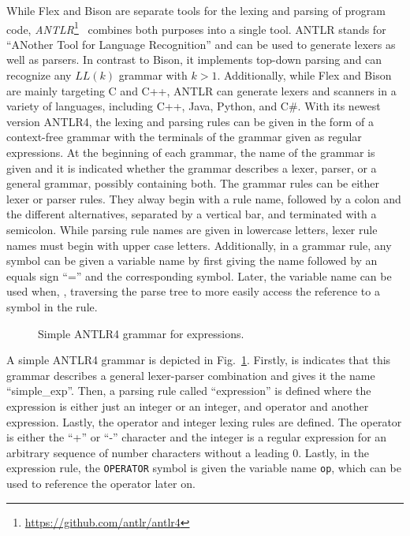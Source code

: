 While Flex and Bison are separate tools for the lexing and parsing of program code, \emph{ANTLR}\footnote{\url{https://github.com/antlr/antlr4}}~\cite{PaQu95} combines both purposes into a single tool. ANTLR stands for ``ANother Tool for Language Recognition'' and can be used to generate lexers as well as parsers. In contrast to Bison, it implements top-down parsing and can recognize any $LL(k)$ grammar with $k > 1$. Additionally, while Flex and Bison are mainly targeting C and C++, ANTLR can generate lexers and scanners in a variety of languages, including C++, Java, Python, and C\#.
With its newest version ANTLR4, the lexing and parsing rules can be given in the form of a context-free grammar with the terminals of the grammar given as regular expressions. At the beginning of each grammar, the name of the grammar is given and it is indicated whether the grammar describes a lexer, parser, or a general grammar, possibly containing both. The grammar rules can be either lexer or parser rules. They alway begin with a rule name, followed by a colon and the different alternatives, separated by a vertical bar, and terminated with a semicolon. While parsing rule names are given in lowercase letters, lexer rule names must begin with upper case letters.
Additionally, in a grammar rule, any symbol can be given a variable name by first giving the name followed by an equals sign ``='' and the corresponding symbol. Later, the variable name can be used when, \eg, traversing the parse tree to more easily access the reference to a symbol in the rule.

\begin{figure}[htp]
    \centering
    
    \caption{Simple ANTLR4 grammar for expressions.}
    \label{fig:example_antlr4}
\end{figure}

A simple ANTLR4 grammar is depicted in Fig.~\ref{fig:example_antlr4}. Firstly, is indicates that this grammar describes a general lexer-parser combination and gives it the name \mbox{``simple\_exp''}. Then, a parsing rule called ``expression'' is defined where the expression is either just an integer or an integer, and operator and another expression. Lastly, the operator and integer lexing rules are defined. The operator is either the ``+'' or ``-'' character and the integer is a regular expression for an arbitrary sequence of number characters without a leading $0$. Lastly, in the expression rule, the \texttt{OPERATOR} symbol is given the variable name \texttt{op}, which can be used to reference the operator later on.